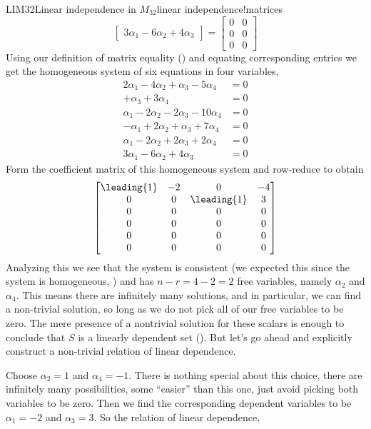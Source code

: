 \begin{example}{LIM32}{Linear independence in $M_{32}$}{linear independence!matrices}
\begin{equation*}
\begin{bmatrix}
3\alpha_1-6\alpha_2+4\alpha_3               
\end{bmatrix}
=\begin{bmatrix}
0&0\\0&0\\0&0
\end{bmatrix}
\end{equation*}
%
Using our definition of matrix equality () and equating corresponding entries we get the homogeneous system of six equations in four variables,
%
\begin{align*}
2\alpha_1-4\alpha_2+\alpha_3-5\alpha_4&=0\\
                             +\alpha_3+3\alpha_4&=0\\
\alpha_1-2\alpha_2-2\alpha_3-10\alpha_4&=0\\
-\alpha_1+2\alpha_2+\alpha_3+7\alpha_4&=0\\ 
\alpha_1-2\alpha_2+2\alpha_3+2\alpha_4&=0\\
3\alpha_1-6\alpha_2+4\alpha_3               &=0
\end{align*}
%
Form the coefficient matrix of this homogeneous system and row-reduce to obtain 
%
\begin{equation*}
\begin{bmatrix}
\leading{1} & -2 & 0 & -4\\
0 & 0 & \leading{1} & 3\\
0 & 0 & 0 & 0\\
0 & 0 & 0 & 0\\
0 & 0 & 0 & 0\\
0 & 0 & 0 & 0
\end{bmatrix}
\end{equation*}
%
Analyzing this we see that the system is consistent (we expected this since the system is homogeneous, ) and has $n-r=4-2=2$ free variables, namely $\alpha_2$ and $\alpha_4$.  This means there are infinitely many solutions, and in particular, we can find a non-trivial solution, so long as we do not pick all of our free variables to be zero.  The mere presence of a nontrivial solution for these scalars is enough to conclude that  $S$ is a linearly dependent set ().  But let's go ahead and explicitly construct a non-trivial relation of linear dependence.\par
%
Choose $\alpha_2=1$ and $\alpha_4=-1$.  There is nothing special about this choice, there are infinitely many possibilities, some ``easier'' than this one, just avoid picking both variables to be zero.  Then we find the corresponding dependent variables to be $\alpha_1=-2$ and $\alpha_3=3$.  So the relation of linear dependence,

\end{example}
